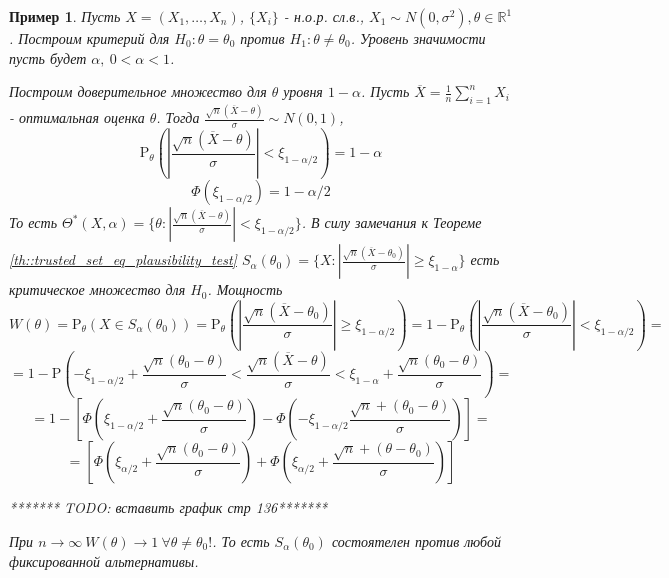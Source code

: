 \documentclass[12pt]{article}
\newtheorem*{example}{Пример}
\theoremstyle{basic_theorem}
\theoremstyle{name_theorem}
\def\R{ \mathbb{R} }
\def\P{ \mathrm{P} }
\begin{document}
\begin{example}
    Пусть \(X=(X_1,\ldots,X_n)\), \(\{X_i\}\) - н.о.р. сл.в., \(X_1\sim N(0,\sigma^2),\theta\in\R^1\).
    Построим критерий для \(H_0:\theta=\theta_0\) против \(H_1:\theta\neq\theta_0\).
    Уровень значимости пусть будет \(\alpha,\ 0<\alpha<1\).

    Построим доверительное множество для \(\theta\) уровня \(1-\alpha\).
    Пусть \(\overline{X}=\frac{1}{n}\sum^n_{i=1}X_i\) - оптимальная оценка \(\theta\).
    Тогда \(\frac{\sqrt{n}(\overline{X}-\theta)}{\sigma}\sim N(0,1)\),
    \[\P_\theta\left(\left\lvert\frac{\sqrt{n}(\overline{X}-\theta)}{\sigma}\right\rvert<\xi_{1-\alpha/2}\right) = 1-\alpha\]
    \[\Phi(\xi_{1-\alpha/2})=1-\alpha/2\]
    То есть \(\Theta^*(X,\alpha)=\{\theta:\left\lvert \frac{\sqrt{n}(\overline{X}-\theta)}{\sigma}\right\rvert <\xi_{1-\alpha/2}\}\).
    В силу замечания к Теореме \ref{th::trusted_set_eq_plausibility_test}
    \(S_{\alpha}(\theta_0)=\{X:\left\lvert \frac{\sqrt{n}(\overline{X}-\theta_0)}{\sigma}\right\rvert \geq\xi_{1-\alpha}\}\)
    есть критическое множество для \(H_0\). Мощность
    \[W(\theta)=\P_\theta(X\in S_\alpha(\theta_0))=\P_\theta\left(\left\lvert \frac{\sqrt{n}(\overline{X}-\theta_0)}{\sigma}\right\rvert \geq\xi_{1-\alpha/2}\right)=
    1-\P_\theta\left(\left\lvert \frac{\sqrt{n}(\overline{X}-\theta_0)}{\sigma}\right\rvert <\xi_{1-\alpha/2}\right)=\]
    \[=1-\P\left(-\xi_{1-\alpha/2} + \frac{\sqrt{n}(\theta_0-\theta)}{\sigma} < \frac{\sqrt{n}(\overline{X}-\theta)}{\sigma} < \xi_{1-\alpha}+\frac{\sqrt{n}(\theta_0-\theta)}{\sigma}\right)=\]
    \[=1-\left[\Phi\left(\xi_{1-\alpha/2}+\frac{\sqrt{n}(\theta_0-\theta)}{\sigma}\right) - \Phi\left(-\xi_{1-\alpha/2}\frac{\sqrt{n}+(\theta_0-\theta)}{\sigma}\right)\right] = \]
    \[=\left[\Phi\left(\xi_{\alpha/2}+\frac{\sqrt{n}(\theta_0-\theta)}{\sigma}\right) + \Phi\left(\xi_{\alpha/2}+\frac{\sqrt{n}+(\theta-\theta_0)}{\sigma}\right)\right]\]


    ******* TODO: вставить график стр 136*******


    При \(n\rightarrow\infty\ W(\theta)\rightarrow 1\ \forall\theta\neq\theta_0!\).
    То есть \(S_\alpha(\theta_0)\) состоятелен против любой фиксированной альтернативы.
\end{example}
\end{document}
